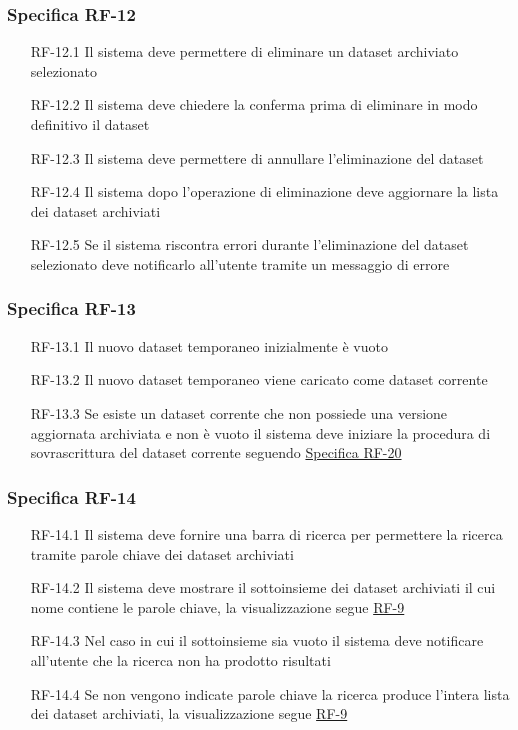 \subsubsection{Specifica RF-12}
\label{subsubsec:RF-12}
\begin{enumerate}
    \item[RF-12.1] Il sistema deve permettere di eliminare un dataset archiviato selezionato
    \item[RF-12.2] Il sistema deve chiedere la conferma prima di eliminare in modo definitivo il dataset
    \item[RF-12.3] Il sistema deve permettere di annullare l'eliminazione del dataset
    \item[RF-12.4] Il sistema dopo l'operazione di eliminazione deve aggiornare la lista dei dataset archiviati
    \item[RF-12.5] Se il sistema riscontra errori durante l'eliminazione del dataset selezionato deve notificarlo all'utente tramite un messaggio di errore
\end{enumerate}


\subsubsection{Specifica RF-13}
\label{subsubsec:RF-13}
\begin{enumerate}
    \item[RF-13.1] Il nuovo dataset temporaneo inizialmente è vuoto
    \item[RF-13.2] Il nuovo dataset temporaneo viene caricato come dataset corrente
    \item[RF-13.3] Se esiste un dataset corrente che non possiede una versione aggiornata archiviata e non è vuoto il sistema deve iniziare la procedura di sovrascrittura del dataset corrente seguendo \hyperref[subsubsec:RF-20]{Specifica RF-20}
\end{enumerate}

\subsubsection{Specifica RF-14}
\label{subsubsec:RF-14}
\begin{enumerate}
    \item[RF-14.1] Il sistema deve fornire una barra di ricerca per permettere la ricerca tramite parole chiave dei dataset archiviati
    \item[RF-14.2] Il sistema deve mostrare il sottoinsieme dei dataset archiviati il cui nome contiene le parole chiave, la visualizzazione segue \hyperref[subsubsec:RF-9]{RF-9}
    \item[RF-14.3] Nel caso in cui il sottoinsieme sia vuoto il sistema deve notificare all'utente che la ricerca non ha prodotto risultati
    \item[RF-14.4] Se non vengono indicate parole chiave la ricerca produce l'intera lista dei dataset archiviati, la visualizzazione segue \hyperref[subsubsec:RF-9]{RF-9}
\end{enumerate}


